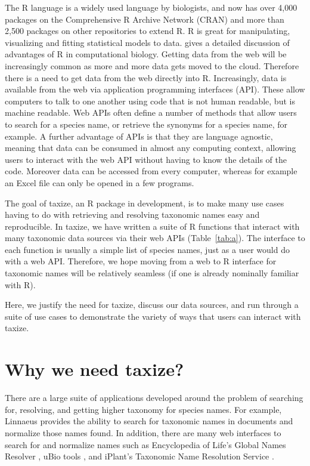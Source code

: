 \documentclass[10pt]{article}\usepackage[]{graphicx}\usepackage[]{color}
\begin{document}
The R language is a widely used language by biologists, and now has over 4,000 packages on the Comprehensive R Archive Network (CRAN) and more than 2,500 packages on other repositories to extend R. R is great for manipulating, visualizing and fitting statistical models to data. \cite{gentleman_bioconductor:_2004} gives a detailed discussion of advantages of R in computational biology. Getting data from the web will be increasingly common as more and more data gets moved to the cloud. Therefore there is a need to get data from the web directly into R. Increasingly, data is available from the web via application programming interfaces (API). These allow computers to talk to one another using code that is not human readable, but is machine readable. Web APIs often define a number of methods that allow users to search for a species name, or retrieve the synonyms for a species name, for example. A further advantage of APIs is that they are language agnostic, meaning that data can be consumed in almost any computing context, allowing users to interact with the web API without having to know the details of the code. Moreover data can be accessed from every computer, whereas for example an Excel file can only be opened in a few programs. 

The goal of taxize, an R package in development, is to make many use cases having to do with retrieving and resolving taxonomic names easy and reproducible. In taxize, we have written a suite of R functions that interact with many taxonomic data sources via their web APIs (Table~\ref{tab:a}). The interface to each function is usually a simple list of species names, just as a user would do with a web API. Therefore, we hope moving from a web to R interface for taxonomic names will be relatively seamless (if one is already nominally familiar with R). 

Here, we justify the need for taxize, discuss our data sources, and run through a suite of use cases to demonstrate the variety of ways that users can interact with taxize. 


\section*{Why we need taxize?}

There are a large suite of applications developed around the problem of searching for, resolving, and getting higher taxonomy for species names. For example, Linnaeus \cite{linnaeus} provides the ability to search for taxonomic names in documents and normalize those names found. In addition, there are many web interfaces to search for and normalize names such as Encyclopedia of Life's Global Names Resolver \cite{eolgnr}, uBio tools \cite{ubio}, and iPlant's Taxonomic Name Resolution Service \cite{tnrs}. 
\end{document}
